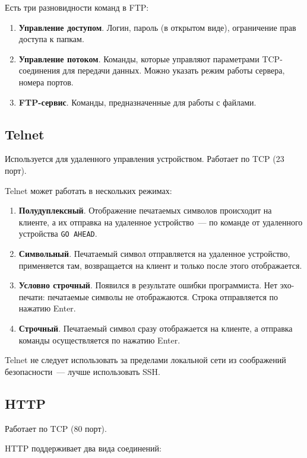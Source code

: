 Есть три разновидности команд в FTP:

\begin{enumerate}
    \item \textbf{Управление доступом}. Логин, пароль (в открытом виде), ограничение прав доступа к папкам.
    \item \textbf{Управление потоком}. Команды, которые управляют параметрами TCP-соединения для передачи данных. Можно указать режим работы сервера, номера портов.
    \item \textbf{FTP-сервис}. Команды, предназначенные для работы с файлами.
\end{enumerate}

\subsection{Telnet}

Используется для удаленного управления устройством. Работает по TCP (23 порт).

Telnet может работать в нескольких режимах:

\begin{enumerate}
    \item \textbf{Полудуплексный}. Отображение печатаемых символов происходит на клиенте, а их отправка на удаленное устройство~--- по команде от удаленного устройства \texttt{GO AHEAD}.
    \item \textbf{Символьный}. Печатаемый символ отправляется на удаленное устройство, применяется там, возвращается на клиент и только после этого отображается.
    \item \textbf{Условно строчный}. Появился в результате ошибки программиста. Нет эхо-печати: печатаемые символы не отображаются. Строка отправляется по нажатию Enter.
    \item \textbf{Строчный}. Печатаемый символ сразу отображается на клиенте, а отправка команды осуществляется по нажатию Enter.
\end{enumerate}

Telnet не следует использовать за пределами локальной сети из соображений
безопасности~--- лучше использовать SSH.

\subsection{HTTP}

Работает по TCP (80 порт).

HTTP поддерживает два вида соединений:

